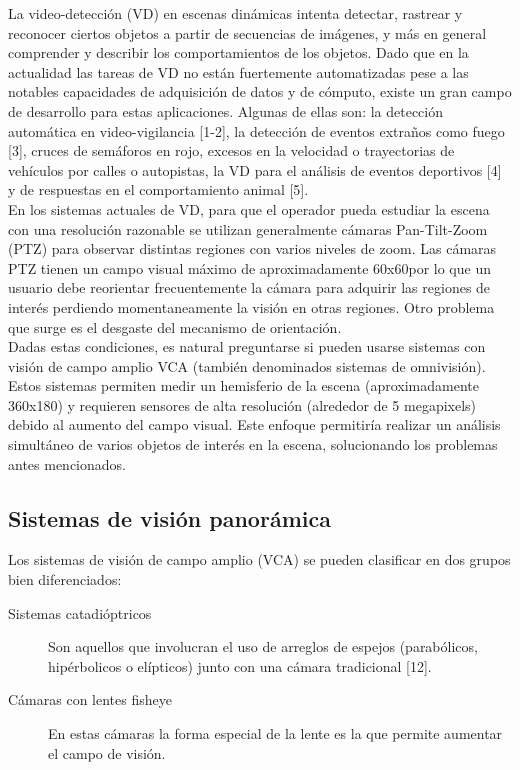 \documentclass[12pt,a4paper]{article}
\begin{document}
La video-detección (VD) en escenas dinámicas intenta detectar, rastrear y reconocer ciertos objetos a partir de secuencias de imágenes, y más en general comprender y describir los comportamientos de los objetos. Dado que en la actualidad las tareas de VD no están fuertemente automatizadas pese a las notables capacidades de adquisición de datos y de cómputo, existe un gran campo de desarrollo para estas aplicaciones.
Algunas de ellas son: la detección automática en video-vigilancia [1-2], la detección de eventos extraños como fuego [3], cruces de semáforos en rojo, excesos en la velocidad o trayectorias de vehículos por calles o autopistas, la VD para el análisis  de eventos deportivos [4] y de respuestas en el comportamiento animal [5]. 
\\En los sistemas actuales de VD, para que el operador pueda estudiar la escena con una resolución razonable se utilizan generalmente cámaras Pan-Tilt-Zoom (PTZ)  para observar distintas regiones con varios niveles de zoom.
Las cámaras PTZ tienen un campo visual máximo de aproximadamente 60\degree x60\degree [6] por lo que un usuario debe reorientar frecuentemente la cámara para adquirir las regiones de interés perdiendo momentaneamente la visión en otras regiones. Otro problema que surge es el desgaste del mecanismo de orientación.
\\Dadas estas condiciones, es natural preguntarse si pueden usarse sistemas con visión de campo amplio VCA (también denominados sistemas de omnivisión).
Estos sistemas permiten medir un hemisferio de la escena (aproximadamente 360\degree x180\degree) y requieren sensores de alta resolución (alrededor de 5 megapixels) debido al aumento del campo visual.
Este enfoque permitiría realizar un análisis simultáneo de varios objetos de interés en la escena, solucionando los problemas antes mencionados.

\subsection{Sistemas de visión panorámica}

Los sistemas de visión de campo amplio (VCA) se pueden clasificar en dos grupos bien diferenciados:

\begin{description}
 \item[Sistemas catadióptricos] Son aquellos que involucran el uso de arreglos de espejos (parabólicos, hipérbolicos o elípticos) junto con una cámara tradicional [12].
 \item[Cámaras con lentes fisheye] En estas cámaras la forma especial de la lente es la que permite aumentar el campo de visión.
\end{description}
\end{document}
